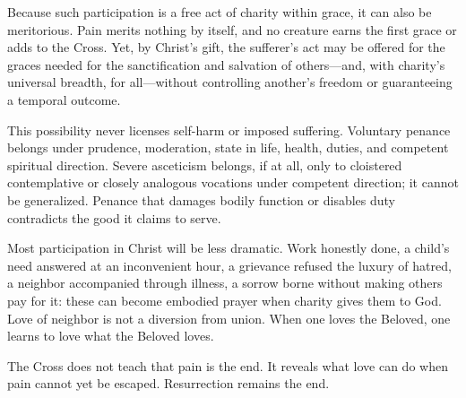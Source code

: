 Because such participation is a free act of charity within grace, it can also be meritorious. Pain merits nothing by itself, and no creature earns the first grace or adds to the Cross. Yet, by Christ's gift, the sufferer's act may be offered for the graces needed for the sanctification and salvation of others---and, with charity's universal breadth, for all---without controlling another's freedom or guaranteeing a temporal outcome.

This possibility never licenses self-harm or imposed suffering. Voluntary penance belongs under prudence, moderation, state in life, health, duties, and competent spiritual direction. Severe asceticism belongs, if at all, only to cloistered contemplative or closely analogous vocations under competent direction; it cannot be generalized. Penance that damages bodily function or disables duty contradicts the good it claims to serve.

Most participation in Christ will be less dramatic. Work honestly done, a child's need answered at an inconvenient hour, a grievance refused the luxury of hatred, a neighbor accompanied through illness, a sorrow borne without making others pay for it: these can become embodied prayer when charity gives them to God. Love of neighbor is not a diversion from union. When one loves the Beloved, one learns to love what the Beloved loves.

The Cross does not teach that pain is the end. It reveals what love can do when pain cannot yet be escaped. Resurrection remains the end.

